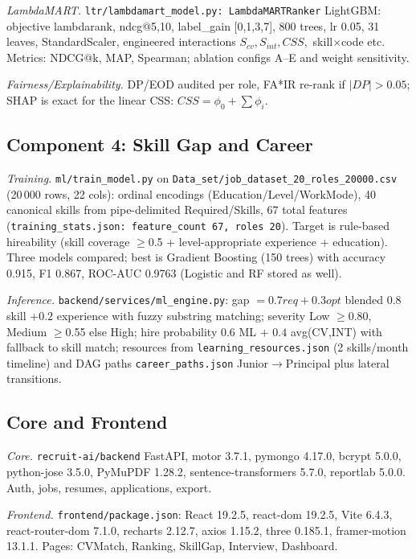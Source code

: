 \documentclass[conference]{IEEEtran}
\begin{document}
\textit{LambdaMART.} \texttt{ltr/lambdamart\_model.py: LambdaMARTRanker} LightGBM: objective lambdarank, ndcg@5,10, label\_gain [0,1,3,7], 800 trees, lr 0.05, 31 leaves, StandardScaler, engineered interactions $S_{cv},S_{int},CSS,$ skill$\times$code etc. Metrics: NDCG@k, MAP, Spearman; ablation configs A--E and weight sensitivity.

\textit{Fairness/Explainability.} DP/EOD audited per role, FA*IR re-rank if $|DP|>0.05$; SHAP is exact for the linear CSS: $CSS=\phi_0+\sum\phi_i$.

\subsection{Component 4: Skill Gap and Career}
\textit{Training.} \texttt{ml/train\_model.py} on \texttt{Data\_set/job\_dataset\_20\_roles\_20000.csv} (20\,000 rows, 22 cols): ordinal encodings (Education/Level/WorkMode), 40 canonical skills from pipe-delimited Required/Skills, 67 total features (\texttt{training\_stats.json: feature\_count 67, roles 20}). Target is rule-based hireability (skill coverage $\geq$0.5 + level-appropriate experience + education). Three models compared; best is Gradient Boosting (150 trees) with accuracy 0.915, F1 0.867, ROC-AUC 0.9763 (Logistic and RF stored as well).

\textit{Inference.} \texttt{backend/services/ml\_engine.py}: gap $=0.7req+0.3opt$ blended $0.8$ skill +$0.2$ experience with fuzzy substring matching; severity Low $\geq$0.80, Medium $\geq$0.55 else High; hire probability $0.6$ ML $+$ $0.4$ avg(CV,INT) with fallback to skill match; resources from \texttt{learning\_resources.json} (2 skills/month timeline) and DAG paths \texttt{career\_paths.json} Junior$\rightarrow$Principal plus lateral transitions.

\subsection{Core and Frontend}
\textit{Core.} \texttt{recruit-ai/backend} FastAPI, motor 3.7.1, pymongo 4.17.0, bcrypt 5.0.0, python-jose 3.5.0, PyMuPDF 1.28.2, sentence-transformers 5.7.0, reportlab 5.0.0. Auth, jobs, resumes, applications, export.

\textit{Frontend.} \texttt{frontend/package.json}: React 19.2.5, react-dom 19.2.5, Vite 6.4.3, react-router-dom 7.1.0, recharts 2.12.7, axios 1.15.2, three 0.185.1, framer-motion 13.1.1. Pages: CVMatch, Ranking, SkillGap, Interview, Dashboard.
\end{document}
